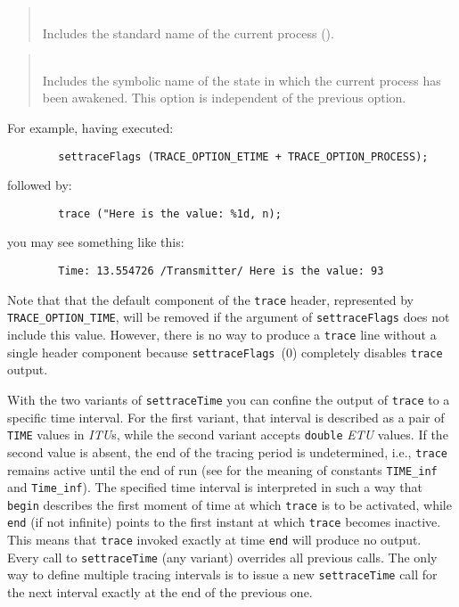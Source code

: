 \begin{quote}
\noindent{}\\ \hspace{0in}
Includes the standard name of the current process ().
\end{quote}

\begin{quote}
\noindent{}\\ \hspace{0in}
Includes the symbolic name of the state in which the current
process has been awakened.
This option is independent of the previous option.
\end{quote}

For example, having executed:
\begin{verbatim}
        settraceFlags (TRACE_OPTION_ETIME + TRACE_OPTION_PROCESS);
\end{verbatim}
followed by:
\begin{verbatim}
        trace ("Here is the value: %1d, n);
\end{verbatim}
\noindent
you may see something like this:
\begin{verbatim}
        Time: 13.554726 /Transmitter/ Here is the value: 93
\end{verbatim}
\noindent
Note that that the default component of the {\tt trace} header, represented by
{\tt TRACE\_OPTION\_TIME}, will be removed if the argument of
{\tt settraceFlags}
does not include this value.
However, there is no way to produce a {\tt trace} line without a single header
component because {\tt settraceFlags}~{(0)}
completely disables {\tt trace} output.

With the two variants of {\tt settraceTime} you can confine the output of
{\tt trace} to a specific time interval.
For the first variant, that interval is described as a pair of {\tt TIME}
values in {\em ITU\/}s, while
the second variant accepts {\tt double} {\em ETU\/} values.
If the second value is absent, the end of the tracing period is undetermined,
i.e., {\tt trace} remains active until the end of run (see  for
the meaning of constants {\tt TIME\_inf} and {\tt Time\_inf}).
The specified time interval is interpreted in such a way that {\tt begin}
describes the first moment of time at which {\tt trace} is to be activated,
while {\tt end} (if not infinite)
points to the first instant at which {\tt trace} becomes
inactive.
This means that {\tt trace} invoked exactly at time {\tt end}
will produce no output.
Every call to {\tt settraceTime} (any variant) overrides all previous
calls.
The only way to define multiple tracing intervals is to issue a new
{\tt settraceTime} call for the next interval exactly at the end of the
previous one.

